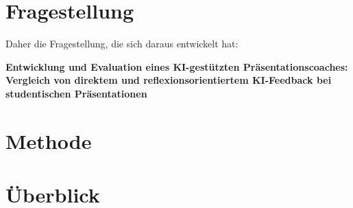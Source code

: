 \section{Fragestellung}
Daher die Fragestellung, die sich daraus entwickelt hat:
\begin{center}
	\begin{minipage}{0.85\textwidth}
		\centering
		\textbf{Entwicklung und Evaluation eines KI-gestützten Präsentationscoaches: Vergleich von direktem und reflexionsorientiertem KI-Feedback bei studentischen Präsentationen}
	\end{minipage}
\end{center}

\section{Methode}

\section{Überblick}

